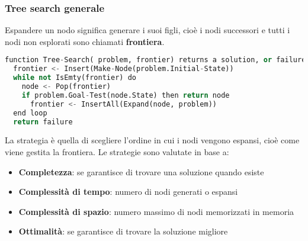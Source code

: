 \documentclass[a4paper]{article}
\begin{document}
\subsubsection{Tree search generale}
Espandere un nodo significa generare i suoi figli, cioè i nodi successori e tutti i nodi
non esplorati sono chiamati \textbf{frontiera}.
\begin{lstlisting}[language=Python]
function Tree-Search( problem, frontier) returns a solution, or failure
  frontier <- Insert(Make-Node(problem.Initial-State))
  while not IsEmty(frontier) do
    node <- Pop(frontier)
    if problem.Goal-Test(node.State) then return node
      frontier <- InsertAll(Expand(node, problem))
  end loop
  return failure
\end{lstlisting}
La strategia è quella di scegliere l'ordine in cui i nodi vengono espansi, cioè
come viene gestita la frontiera. Le strategie sono valutate in base a:
\begin{itemize}
  \item \textbf{Completezza}: se garantisce di trovare una soluzione quando esiste
  \item \textbf{Complessità di tempo}: numero di nodi generati o espansi
  \item \textbf{Complessità di spazio}: numero massimo di nodi memorizzati in memoria
  \item \textbf{Ottimalità}: se garantisce di trovare la soluzione migliore
\end{itemize}
\end{document}
